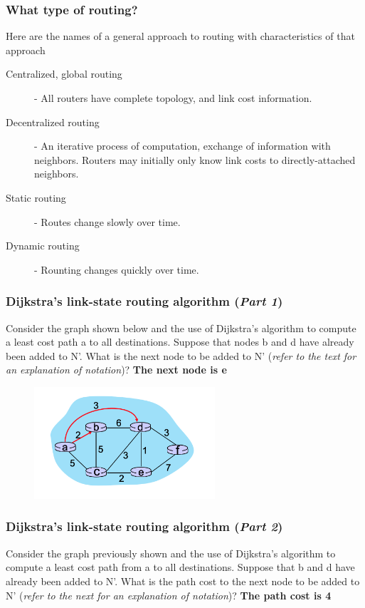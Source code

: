     \subsubsection*{What type of routing?}
    \noindent Here are the names of a general approach to routing with characteristics of that approach
    \begin{description}
        \item[Centralized, global routing] - All routers have complete topology, and link cost information.
        \item[Decentralized routing] - An iterative process of computation, exchange of information with neighbors. Routers may initially only
        know link costs to directly-attached neighbors.
        \item[Static routing] - Routes change slowly over time.
        \item[Dynamic routing] - Rounting changes quickly over time.     
    \end{description}

    \subsubsection*{Dijkstra's link-state routing algorithm (\textit{Part 1})}
    \noindent Consider the graph shown below and the use of Dijkstra's algorithm to compute a least cost path a to all destinations. Suppose that nodes b and d have
    already been added to N'. What is the next node to be added to N' (\textit{refer to the text for an explanation of notation})? \textbf{The next node is e}
    \begin{figure}[H]
        \centering
        \includegraphics[width=0.6\textwidth]{img/Dijsktra_kc_network.png}
    \end{figure}

    \subsubsection*{Dijkstra's link-state routing algorithm (\textit{Part 2})}
    \noindent Consider the graph previously shown and the use of Dijkstra's algorithm to compute a least cost path from a to all destinations. Suppose that b and d have
    already been added to N'. What is the path cost to the next node to be added to N' (\textit{refer to the next for an explanation of notation})? \textbf{The path cost is 4}

